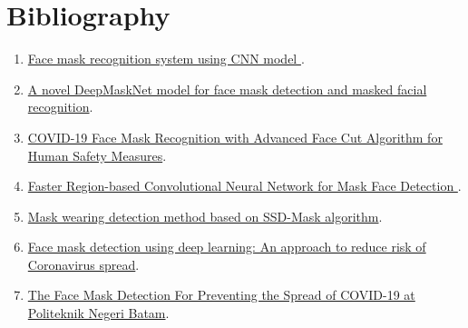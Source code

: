 
\section{Bibliography} 

\begin{enumerate}
\item \href{https://www.sciencedirect.com/science/article/pii/S2772528621000352}{Face mask recognition system using CNN model }. 

\item \href{https://www.sciencedirect.com/science/article/pii/S1319157821003633}{A novel DeepMaskNet model for face mask detection and masked facial
	recognition}.

\item \href{ https://arxiv.org/abs/2110.04316}{COVID-19 Face Mask Recognition with Advanced Face Cut Algorithm for Human Safety Measures}.

\item \href{https://ieeexplore.ieee.org/document/9651744}{Faster Region-based Convolutional Neural Network 
	for Mask Face Detection }.
 

\item \href{https://ieeexplore.ieee.org/document/9443800}{ Mask wearing detection method based on SSD-Mask algorithm}.

\item \href{https://www.sciencedirect.com/science/article/pii/S1532046421001775}{Face mask detection using deep learning: An approach to reduce risk of 
	Coronavirus spread}.

\item \href{https://ieeexplore.ieee.org/document/9350556}{The Face Mask Detection For Preventing the Spread 
	of COVID-19 at Politeknik Negeri Batam}.

\end{enumerate}
